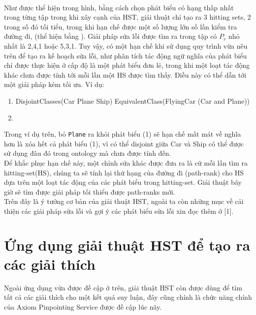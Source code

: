 \\\hspace*{.05\textwidth} Như được thể hiện trong hình, bằng cách chọn phát biểu có hạng thấp nhất trong từng tập trong khi xây cạnh của HST, giải thuật chỉ tạo ra 3 hitting sets, 2 trong số đó tối tiểu, trong khi hạn chế được một số lượng lớn số lần kiểm tra đường đi, (thể hiện bằng \xmark). Giải pháp sửa lỗi được tìm ra trong tập có $P_{r}$ nhỏ nhất là {2,4,1} hoặc {5,3,1}.
\hspace*{.05\textwidth} Tuy vậy, có một hạn chế khi sử dụng quy trình vừa nêu trên để tạo ra kế hoạch sửa lỗi, như phân tích tác động ngữ nghĩa của phát biểu chỉ được thực hiện ở cấp độ là một phát biểu đơn lẻ, trong khi một loạt tác động khác chưa được tính tới mỗi lần một HS được tìm thấy. Điều này có thể dẫn tới một giải pháp kém tối ưu. Ví dụ:
\begin{enumerate}
\item
DisjointClasses(Car Plane Ship)
EquivalentClass(FlyingCar (Car and Plane))
\item
\end{enumerate}
Trong ví dụ trên, bỏ \texttt{Plane} ra khỏi phát biểu (1) sẽ hạn chế mất mát về nghĩa hơn là xóa hết cả phát biểu (1), vì có thể disjoint giữa Car và Ship có thể được sử dụng đâu đó trong ontology mà chưa được tính đến.
\\\hspace*{.05\textwidth} Để khắc phục hạn chế này, một chỉnh sửa khác được đưa ra là cứ mỗi lần tìm ra hitting-set(HS), chúng ta sẽ tính lại thứ hạng của đường đi (path-rank) cho HS dựa trên một loạt tác động của các phát biểu trong hitting-set. Giải thuật bây giờ sẽ tìm được giải pháp tối thiểu được path-ranks mới.
\\
Trên đây là ý tưởng cơ bản của giải thuật HST, ngoài ta còn những mục về cải thiện các giải pháp sửa lỗi và gợi ý các phát biểu sửa lỗi xin đọc thêm ở [1].
\section{Ứng dụng giải thuật HST để tạo ra các giải thích}
Ngoài ứng dụng vừa được đề cập ở trên, giải thuật HST còn được dùng để tìm tất cả các giải thích cho một kết quả suy luận, đây cũng chính là chức năng chính của Axiom Pinpointing Service được đề cập lúc nãy.
